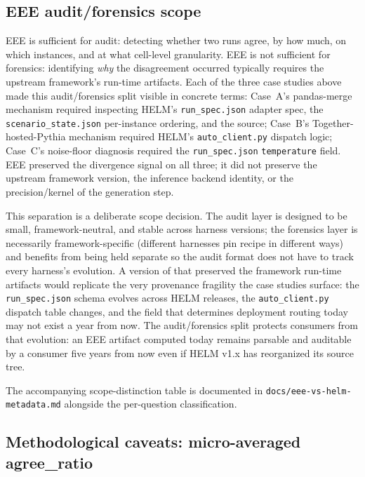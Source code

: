 \subsection{EEE audit/forensics scope}
\label{sec:app-helm-eee-scope-v2}

EEE is sufficient for audit: detecting whether two runs agree, by how
  much, on which instances, and at what cell-level granularity.
EEE is not sufficient for forensics: identifying \emph{why} the
  disagreement occurred typically requires the upstream framework's
  run-time artifacts.
Each of the three case studies above made this audit/forensics split
  visible in concrete terms: Case~A's pandas-merge mechanism required
  inspecting HELM's \texttt{run\_spec.json} adapter spec, the
  \texttt{scenario\_state.json} per-instance ordering, and the
   source; Case~B's
  Together-hosted-Pythia mechanism required HELM's
  \texttt{auto\_client.py} dispatch logic; Case~C's noise-floor
  diagnosis required the \texttt{run\_spec.json} \texttt{temperature}
  field.
EEE preserved the divergence signal on all three; it did not preserve
  the upstream framework version, the inference backend identity, or
  the precision/kernel of the generation step.

This separation is a deliberate scope decision.
The audit layer is designed to be small, framework-neutral, and stable
  across harness versions; the forensics layer is necessarily
  framework-specific (different harnesses pin recipe in different
  ways) and benefits from being held separate so the audit format does
  not have to track every harness's evolution.
A version of \eee{} that preserved the framework run-time artifacts
  would replicate the very provenance fragility the case studies
  surface: the \texttt{run\_spec.json} schema evolves across HELM
  releases, the \texttt{auto\_client.py} dispatch table changes, and
  the field that determines deployment routing today may not exist a
  year from now.
The audit/forensics split protects \eee{} consumers from that
  evolution: an EEE artifact computed today remains parsable and
  auditable by a consumer five years from now even if HELM v1.x has
  reorganized its source tree.

The accompanying scope-distinction table is documented in
  \texttt{docs/eee-vs-helm-metadata.md} alongside the per-question
  classification.

\subsection{Methodological caveats: micro-averaged agree\_ratio}
\label{sec:app-helm-microavg-v2}

